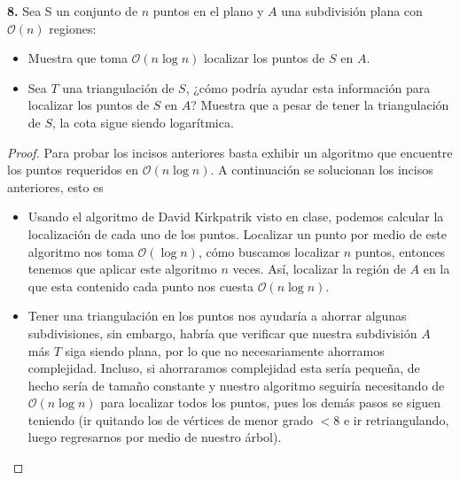 \textbf{8.} Sea S un conjunto de $n$ puntos en el plano y $A$ una subdivisión plana con $\mathcal{O}(n)$
regiones:
\begin{itemize}
\item Muestra que toma $\mathcal{O}(n \log n)$ localizar los puntos de $S$ en $A$.
\item Sea $T$ una triangulación de $S$, ¿cómo podría ayudar esta información para
localizar los puntos de $S$ en $A$? Muestra que a pesar de tener la triangulación
de $S$, la cota sigue siendo logarítmica.
\end{itemize}

\begin{proof}
  Para probar los incisos anteriores basta exhibir un algoritmo que encuentre los puntos
  requeridos en $\mathcal{O}(n \log n)$. A continuación se solucionan los incisos anteriores,
  esto es
  \begin{itemize}
  \item Usando el algoritmo de David Kirkpatrik visto en clase, podemos calcular la localización
    de cada uno de los puntos. Localizar un punto por medio de este algoritmo nos toma $\mathcal{O}(\log n)$,
    cómo buscamos localizar $n$ puntos, entonces tenemos que aplicar este algoritmo $n$ veces. Así,
    localizar la región de $A$ en la que esta contenido cada punto nos cuesta $\mathcal{O}(n \log n)$.
  \item Tener una triangulación en los puntos nos ayudaría a ahorrar algunas subdivisiones, sin embargo,
    habría que verificar que nuestra subdivisión $A$ más $T$ siga siendo plana, por lo que no necesariamente
    ahorramos complejidad. Incluso, si ahorraramos complejidad esta sería pequeña, de hecho sería de tamaño
    constante y nuestro algoritmo seguiría necesitando de $\mathcal{O}(n \log n)$ para localizar todos
    los puntos, pues los demás pasos se siguen teniendo (ir quitando los de vértices de menor grado $< 8$
    e ir retriangulando, luego regresarnos por medio de nuestro árbol).
  \end{itemize}
\end{proof}
